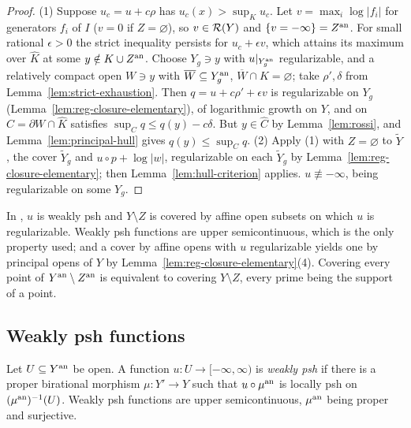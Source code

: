 \begin{proof}
(1) Suppose $u_c=u+c\rho$ has $u_c(x)>\sup_Ku_c$. Let $v=\max_i\log|f_i|$ for generators $f_i$ of $I$
($v=0$ if $Z=\varnothing$), so $v\in\mathcal{R}(Y)$ and $\{v=-\infty\}=Z^{\mathrm{an}}$. For small rational $\epsilon>0$
the strict inequality persists for $u_c+\epsilon v$, which attains its maximum over $\widehat K$ at
some $y\notin K\cup Z^{\mathrm{an}}$. Choose $Y_g\ni y$ with $u|_{Y_g^{\mathrm{an}}}$ regularizable, and a relatively
compact open $W\ni y$ with $\overline W\subseteq Y_g^{\mathrm{an}}$, $\overline W\cap K=\varnothing$; take
$\rho',\delta$ from Lemma~\ref{lem:strict-exhaustion}. Then $q=u+c\rho'+\epsilon v$ is regularizable
on $Y_g$ (Lemma~\ref{lem:reg-closure-elementary}), of logarithmic growth on $Y$, and on
$C=\partial W\cap\widehat K$ satisfies $\sup_Cq\le q(y)-c\delta$. But $y\in\widehat C$ by
Lemma~\ref{lem:rossi}, and Lemma~\ref{lem:principal-hull} gives $q(y)\le\sup_Cq$.
(2) Apply (1) with $Z=\varnothing$ to $\widetilde Y$, the cover $\widetilde Y_g$ and $u\circ p+\log|w|$,
regularizable on each $\widetilde Y_g$ by Lemma~\ref{lem:reg-closure-elementary}; then
Lemma~\ref{lem:hull-criterion} applies. $u\not\equiv-\infty$, being regularizable on some $Y_g$.
\end{proof}

\begin{remark}\label{rmk:gluing-hypotheses}
In \cite[Proposition~5.20]{FHX}, $u$ is weakly psh and $Y\setminus Z$ is covered by affine open
subsets on which $u$ is regularizable. Weakly psh functions are upper semicontinuous, which is the
only property used; and a cover by affine opens with $u$ regularizable yields one by principal
opens of $Y$ by Lemma~\ref{lem:reg-closure-elementary}(4). Covering every point of $Y^{\mathrm{an}}\setminus
Z^{\mathrm{an}}$ is equivalent to covering $Y\setminus Z$, every prime being the support of a point.
\end{remark}

\subsection{Weakly psh functions}\label{subsec:weakly-psh}

\begin{definition}\label{def:weakly-psh}
\leanok
{}
Let $U\subseteq Y^{\mathrm{an}}$ be open. A function $u\colon U\to[-\infty,\infty)$ is \emph{weakly psh} if
there is a proper birational morphism $\mu\colon Y'\to Y$ such that $u\circ\mu^{\mathrm{an}}$ is locally psh on
$(\mu^{\mathrm{an}})^{-1}(U)$. Weakly psh functions are upper semicontinuous, $\mu^{\mathrm{an}}$ being proper and
surjective.
\end{definition}

